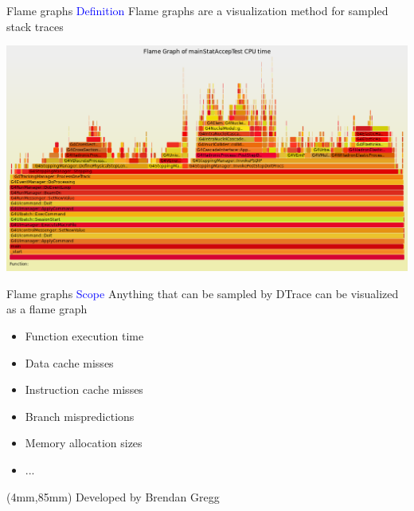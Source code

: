 \documentclass{beamer}
\newenvironment{reference}[2]{%
  \begin{textblock*}{\textwidth}(#1,#2) 
      \tiny\bgroup\color{red!50!black}}{\egroup\end{textblock*}}
\begin{document}
\begin{frame}{Flame graphs}
\textcolor{blue}{Definition} Flame graphs are a visualization method for sampled stack traces

\begin{center}
  \includegraphics[width=1.0\textwidth]{timeflame.png}
\end{center}
\end{frame}

\begin{frame}{Flame graphs}
\textcolor{blue}{Scope} Anything that can be sampled by DTrace can be visualized as a flame graph

\begin{itemize}
	\item Function execution time
	\item Data cache misses
	\item Instruction cache misses
	\item Branch mispredictions
	\item Memory allocation sizes
	\item ...
\end{itemize}

\begin{reference}{4mm}{85mm}
	Developed by Brendan Gregg
\end{reference}
\end{frame}
\end{document}
